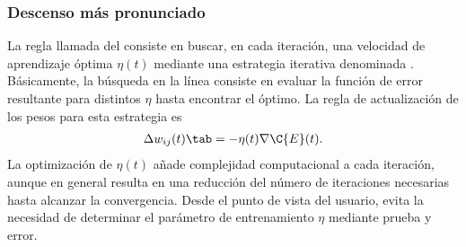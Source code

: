 %
\subsubsection{Descenso más pronunciado}
%
La regla llamada del  consiste
en buscar, en cada iteración, una velocidad de aprendizaje óptima
$\eta(t)$ mediante una estrategia iterativa denominada .
Básicamente, la búsqueda en la línea consiste en evaluar
la función de error resultante para distintos $\eta$ hasta encontrar
el óptimo.
La regla de actualización de los pesos para esta estrategia es
%
\begin{align}\label{e2:delta-rule-steepest}
  \Delta w_{ij}(t)\tab=-\eta(t)\nabla{\C{E}(t)}.
\end{align}
%
La optimización de $\eta(t)$ añade complejidad computacional a cada
iteración, aunque en general resulta en una reducción del número de
iteraciones necesarias hasta alcanzar la convergencia.
Desde el punto de vista del usuario, evita la necesidad de determinar
el parámetro de entrenamiento $\eta$ mediante prueba y error.
